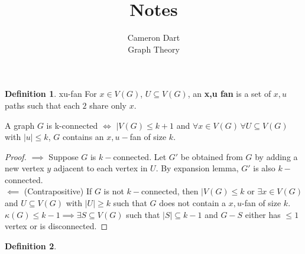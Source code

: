 \documentclass{article}
\newcommand{\vg}{V(G)}
\theoremstyle{definition}
\newtheorem{definition}{Definition}[section]
\theoremstyle{remark}
\newenvironment{theorem}[2][Theorem]{\begin{trivlist}
\item[\hskip \labelsep {\bfseries #1}\hskip \labelsep {\bfseries #2.}]}{\end{trivlist}}
\begin{document}
\title{Notes} 
\author{Cameron Dart\\ Graph Theory} 

\maketitle
\begin{definition}{xu-fan}
	For $x \in V(G)$, $U \subseteq V(G)$, an \textbf{x,u fan} is a set of $x,u$ paths such that each $2$ share only $x$.
\end{definition}

\begin{theorem}{4.1.2 Fan Lemma}
	A graph $G$ is k-connected $\iff$ $|V(G) \leq k + 1$ and $\forall x \in V(G) \, \forall U \subseteq V(G)$ with $|u| \leq k$, $G$ contains an $x,u-$fan of size $k$.
\end{theorem}

\begin{proof}
	$\implies$ Suppose $G$ is $k-$connected. Let $G'$ be obtained from $G$ by adding a new vertex $y$ adjacent to each vertex in $U$. By expansion lemma, $G'$ is also $k-$connected.\\
	$\impliedby$ (Contrapositive) If $G$ is not $k-$connected, then $|V(G) \leq k$ or $\exists x \in V(G) $ and $U \subseteq \vg $ with $|U| \geq k$ such that $G$ does not contain a $x,u$-fan of size $k$.\\
	$\kappa(G) \leq k- 1 \implies \exists S \subseteq \vg $ such that $|S| \subseteq k - 1$ and $G - S$ either has $\leq 1$ vertex or is disconnected.
\end{proof}

\begin{definition}
	
\end{definition}
\end{document}

